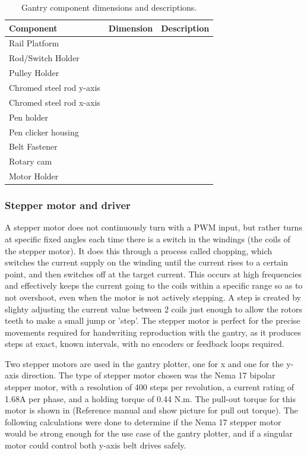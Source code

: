 \begin{table}[!htbp]
    \centering
    \begin{tabularx}{\linewidth}{|X|X|X|}
        \hline
        \textbf{Component} & \textbf{Dimension} & \textbf{Description} \\
        \hline
        Rail Platform & & \\
        \hline
        Rod/Switch Holder & & \\
        \hline
        Pulley Holder & & \\
        \hline
        Chromed steel rod y-axis & & \\
        \hline
        Chromed steel rod x-axis & & \\
        \hline
        Pen holder & & \\
        \hline
        Pen clicker housing & & \\
        \hline
        Belt Fastener & & \\
        \hline
        Rotary cam & & \\
        \hline
        Motor Holder & & \\
        \hline
    \end{tabularx}
    \caption{Gantry component dimensions and descriptions.}
    \label{tab:gantry-component-dimensions}
\end{table}

\subsubsection{Stepper motor and driver}
A stepper motor does not continuously turn with a PWM input, but rather turns at specific fixed angles each time there is a switch in the windings (the coils of the stepper motor). It does this through a process called chopping, which switches the current supply on the winding until the current rises to a certain point, and then switches off at the target current.  This occurs at high frequencies and effectively keeps the current going to the coils within a specific range so as to not overshoot, even when the motor is not actively stepping. A step is created by slighty adjusting the current value between 2 coils just enough to allow the rotors teeth to make a small jump or 'step'. The stepper motor is perfect for the precise movements required for handwriting reproduction with the gantry, as it produces steps at exact, known intervals, with no encoders or feedback loops required. 

Two stepper motors are used in the gantry plotter, one for x and one for the y-axis direction. The type of stepper motor chosen was the Nema 17 bipolar stepper motor, with a resolution of 400 steps per revolution, a current rating of 1.68A per phase, and a holding torque of 0.44 N.m. The pull-out torque for this motor is shown in (Reference manual and show picture for pull out torque). The following calculations were done to determine if the Nema 17 stepper motor would be strong enough for the use case of the gantry plotter, and if a singular motor could control both y-axis belt drives safely.

